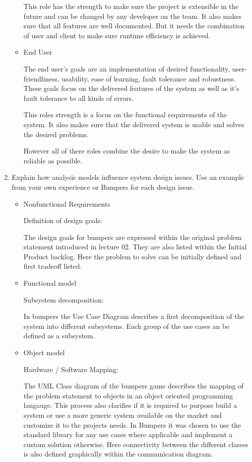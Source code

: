 \documentclass[a4paper, 10pt]{article}
\begin{document}
\begin{enumerate}
\begin{itemize}
        This role has the strength to make sure the project is extensible in the future and can be changed by any 
        developer on the team. It also makes sure that all features are well documented. But it needs the combination of 
        user and client to make sure runtime efficiency is achieved. 
        \item End User

        The end user's goals are an implementation of desired functionality, user-friendliness, usability,
        ease of learning, fault tolerance and robustness.
        These goals focus on the delivered features of the system as well as it's fault tolerance to all kinds of 
        errors.

        This roles strength is a focus on the functional requirements of the system. It also makes sure that 
        the delivered system is usable and solves the desired problems.

        However all of there roles combine the desire to make the system as reliable as possible.
    \end{itemize}
    \item
    Explain how analysis models influence system design issues. Use an
    example from your own experience or Bumpers for each design issue.
    \vspace{0.5cm}

    \begin{itemize}
        \item Nonfunctional Requirements

        Definition of design goals:
        
        The design goals for bumpers are expressed within the original problem statement introduced in lecture 02. 
        They are also listed within the Initial Product backlog. Here the problem to solve can be initially defined 
        and first tradeoff listed.
        \item Functional model 

        Subsystem decomposition:    

        In bumpers the Use Case Diagram describes a first decomposition of the system into different subsystems.
        Each group of the use cases an be defined as a subsystem.

        \item Object model

        Hardware / Software Mapping:

        The UML Class diagram of the bumpers game describes the mapping of the problem statement to objects in an 
        object oriented programming langauge. This process also clarifies if it is required to purpose build a system or 
        use a more generic system available on the market and customize it to the projects needs. In Bumpers it was chosen to 
        use the standard library for any use cases where applicable and implement a custom solution otherwise.
        Here connectivity between the different classes is also defined graphically within the communication diagram.


\end{itemize}
\end{enumerate}
\end{document}
